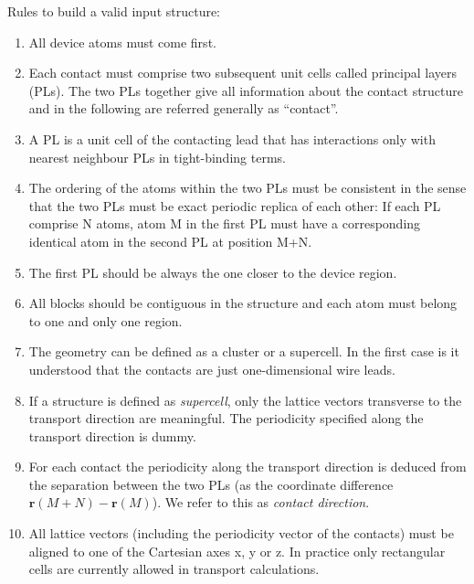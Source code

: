 Rules to build a valid input structure:
\begin{enumerate}
\item \label{rule1} All device atoms must come first.
\item \label{rule2} Each contact must comprise two subsequent unit cells called
  principal layers (PLs). The two PLs together give all information about the
  contact structure and in the following are referred generally as ``contact''.
\item \label{rule3} A PL is a unit cell of the contacting lead that has
  interactions only with nearest neighbour PLs in tight-binding terms.
\item \label{rule4} The ordering of the atoms within the two PLs must be
  consistent in the sense that the two PLs must be exact periodic replica of each
  other: If each PL comprise N atoms, atom M in the first PL must have a
  corresponding identical atom in the second PL at position M+N.
\item \label{rule5} The first PL should be always the one closer to the device
  region.
\item \label{rule6} All blocks should be contiguous in the structure and each
  atom must belong to one and only one region.
\item \label{rule7} The geometry can be defined as a cluster or a supercell. In
  the first case is it understood that the contacts are just one-dimensional
  wire leads.
\item \label{rule8} If a structure is defined as {\em supercell}, only the
  lattice vectors transverse to the transport direction are meaningful. The
  periodicity specified along the transport direction is dummy.
\item \label{rule9} For each contact the periodicity along the transport
  direction is deduced from the separation between the two PLs (as the
  coordinate difference $\mathbf{r}(M+N)-\mathbf{r}(M)$). We refer to this as
  {\em contact direction}.
\item \label{rule10} All lattice vectors (including the periodicity vector of
  the contacts) must be aligned to one of the Cartesian axes x, y or z. In
  practice only rectangular cells are currently allowed in transport
  calculations.
\end{enumerate}


